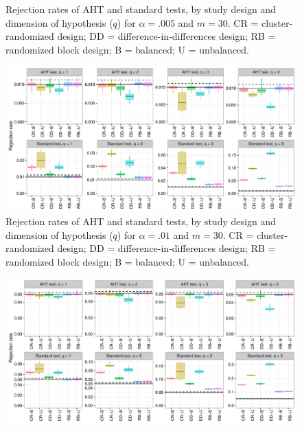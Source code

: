 \documentclass{article}\usepackage[]{graphicx}\usepackage[]{color}
\newenvironment{knitrout}{}{} %
\begin{document}
\begin{landscape}
\begin{knitrout}
\begin{figure}[H]
{}

\caption[Rejection rates of AHT and standard tests, by study design and dimension of hypothesis (]{Rejection rates of AHT and standard tests, by study design and dimension of hypothesis ($q$) for $\alpha = .005$ and $m = 30$. CR = cluster-randomized design; DD = difference-in-differences design; RB = randomized block design; B = balanced; U = unbalanced.}\label{fig:balance_005_30}
\end{figure}


\end{knitrout}

\begin{knitrout}
\color{fgcolor}\begin{figure}[H]

{\centering \includegraphics[width=\linewidth]{CR_fig/balance_01_30-1} 

}

\caption[Rejection rates of AHT and standard tests, by study design and dimension of hypothesis (]{Rejection rates of AHT and standard tests, by study design and dimension of hypothesis ($q$) for $\alpha = .01$ and $m = 30$. CR = cluster-randomized design; DD = difference-in-differences design; RB = randomized block design; B = balanced; U = unbalanced.}\label{fig:balance_01_30}
\end{figure}


\end{knitrout}

\begin{knitrout}
\color{fgcolor}\begin{figure}[H]

{\centering \includegraphics[width=\linewidth]{CR_fig/balance_05_30-1} 

}
\end{figure}
\end{knitrout}
\end{landscape}
\end{document}
